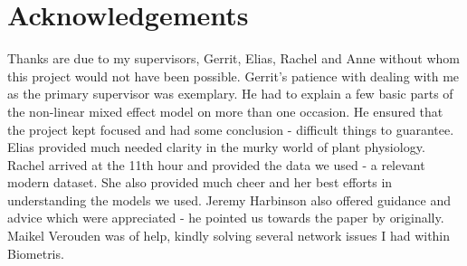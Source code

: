 \documentclass[11pt]{article} %
\begin{document}
\section*{Acknowledgements}
Thanks are due to my supervisors, Gerrit, Elias, Rachel and Anne without whom this project would not have been possible. Gerrit's patience with dealing with me as the primary supervisor was exemplary. He had to explain a few basic parts of the non-linear mixed effect model on more than one occasion. He ensured that the project kept focused and had some conclusion - difficult things to guarantee. Elias provided much needed clarity in the murky world of plant physiology. Rachel arrived at the 11th hour and provided the data we used - a relevant modern dataset. She also provided much cheer and her best efforts in understanding the models we used. Jeremy Harbinson also offered guidance and advice which were appreciated - he pointed us towards the paper by \citet{YinUsingcombinedmeasurements2009} originally. Maikel Verouden was of help, kindly solving several network issues I had within Biometris.

\newpage
\end{document}
